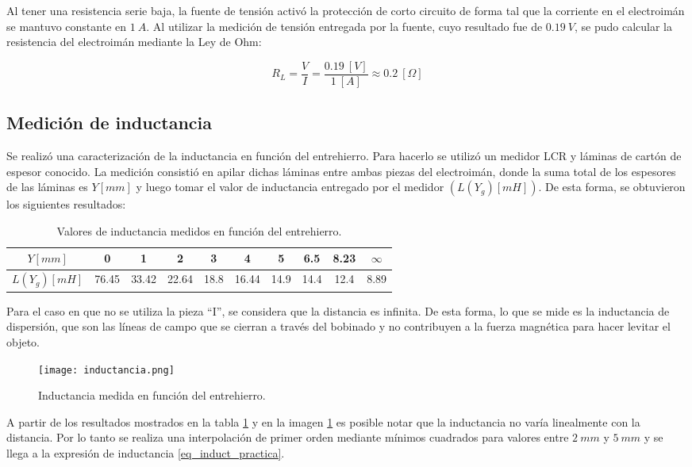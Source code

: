 \noindent Al tener una resistencia serie baja, la fuente de tensión activó la protección de corto circuito de forma tal que la corriente en el electroimán se mantuvo constante en $1\:A$. Al utilizar la medición de tensión entregada por la fuente, cuyo resultado fue de $0.19\:V$, se pudo calcular la resistencia del electroimán mediante la Ley de Ohm:

\begin{equation}
	R_{L}=\frac{V}{I}=\frac{0.19\:[V]}{1\:[A]}	\approx0.2\:[\Omega]
\end{equation}

\subsection{Medición de inductancia}

\noindent Se realizó una caracterización de la inductancia en función del entrehierro. Para hacerlo se utilizó un medidor LCR y láminas de cartón de espesor conocido. La medición consistió en apilar dichas láminas entre ambas piezas del electroimán, donde la suma total de los espesores de las láminas es $Y[mm]$ y luego tomar el valor de inductancia entregado por el medidor $(L(Y_{g})[mH])$. De esta forma, se obtuvieron los siguientes resultados:

\begin{table} [H]
	\begin{center}
		\begin{tabular}{| c | c | c | c | c | c | c | c | c | c |}
			\hline			
			$Y[mm]$ & 0 & 1 & 2 & 3 & 4 & 5 & 6.5 & 8.23 & $\infty$ \\ \hline
			$L(Y_{g})[mH]$ & 76.45 & 33.42 & 22.64 & 18.8 & 16.44 & 14.9 & 14.4 & 12.4 & 8.89\\ \hline
		\end{tabular}
		\caption{Valores de inductancia medidos en función del entrehierro.}
		\label{tab_mediciones_inductancia}
	\end{center}
\end{table}

\noindent Para el caso en que no se utiliza la pieza ``I'', se considera que la distancia es infinita. De esta forma, lo que se mide es la inductancia de dispersión, que son las líneas de campo que se cierran a través del bobinado y no contribuyen a la fuerza magnética para hacer levitar el objeto.



\begin{figure} [H]
	\centering
	\texttt{[image: inductancia.png]}
	\caption{Inductancia medida en función del entrehierro.}
	\label{fig:img_inductancia_medida}
\end{figure}
\noindent A partir de los resultados mostrados en la tabla \ref{tab_mediciones_inductancia} y en la imagen \ref{fig:img_inductancia_medida} es posible notar que la inductancia no varía linealmente con la distancia. Por lo tanto se realiza una interpolación de primer orden mediante mínimos cuadrados para valores entre $2\:mm$ y $5\:mm$ y se llega a la expresión de inductancia 	\ref{eq_induct_practica}.

